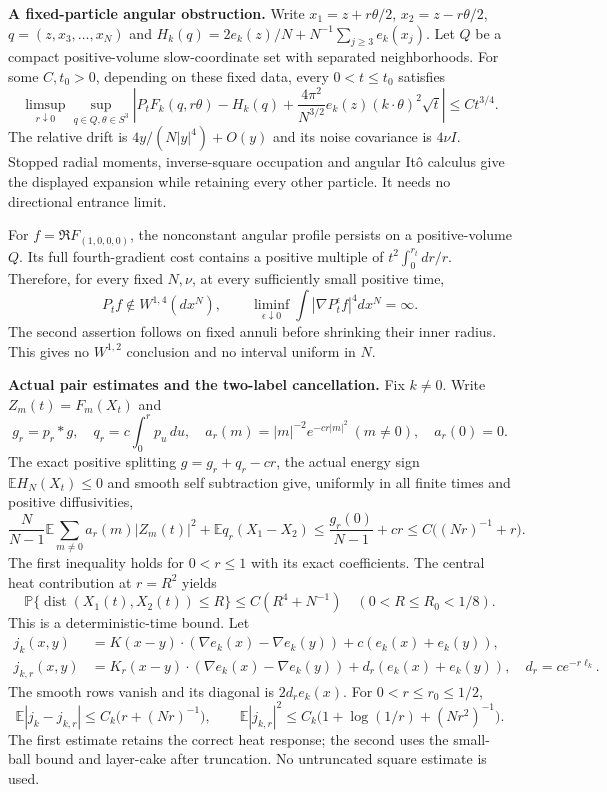 \documentclass[11pt]{article}
\newcommand{\E}{\mathbb E}
\begin{document}
\newpage
\noindent\textbf{A fixed-particle angular obstruction.}
Write $x_1=z+r\theta/2$, $x_2=z-r\theta/2$, $q=(z,x_3,\ldots,x_N)$ and
$H_k(q)=2e_k(z)/N+N^{-1}\sum_{j\ge3}e_k(x_j)$. Let $Q$ be a compact positive-volume slow-coordinate set with separated neighborhoods. For some $C,t_0>0$, depending on these fixed data, every $0<t\le t_0$ satisfies
\[
 \limsup_{r\downarrow0}\sup_{q\in Q,\theta\in S^3}
 \left|P_tF_k(q,r\theta)-H_k(q)
       +\frac{4\pi^2}{N^{3/2}}e_k(z)(k\cdot\theta)^2\sqrt t\right|
 \le Ct^{3/4}.
\]
The relative drift is $4y/(N|y|^4)+O(y)$ and its noise covariance is $4\nu I$. Stopped radial moments, inverse-square occupation and angular It\^o calculus give the displayed expansion while retaining every other particle. It needs no directional entrance limit.

For $f=\Re F_{(1,0,0,0)}$, the nonconstant angular profile persists on a positive-volume $Q$. Its full fourth-gradient cost contains a positive multiple of $t^2\int_0^{r_t}dr/r$. Therefore, for every fixed $N,\nu$, at every sufficiently small positive time,
\[
 P_tf\notin W^{1,4}(dx^N),\qquad
 \liminf_{\epsilon\downarrow0}\int|\nabla P_t^\epsilon f|^4dx^N=\infty.
\]
The second assertion follows on fixed annuli before shrinking their inner radius. This gives no $W^{1,2}$ conclusion and no interval uniform in $N$.

\noindent\textbf{Actual pair estimates and the two-label cancellation.}
Fix $k\ne0$. Write $Z_m(t)=F_m(X_t)$ and
\[
 g_r=p_r*g,\quad q_r=c\int_0^r p_u\,du,\quad
 a_r(m)=|m|^{-2}e^{-cr|m|^2}\ (m\ne0),\quad a_r(0)=0.
\]
The exact positive splitting $g=g_r+q_r-cr$, the actual energy sign $\E H_N(X_t)\le0$ and smooth self subtraction give, uniformly in all finite times and positive diffusivities,
\[
 \frac N{N-1}\E\sum_{m\ne0}a_r(m)|Z_m(t)|^2+\E q_r(X_1-X_2)
 \le\frac{g_r(0)}{N-1}+cr\le C\bigl((Nr)^{-1}+r\bigr).
\]
The first inequality holds for $0<r\le1$ with its exact coefficients. The central heat contribution at $r=R^2$ yields
\[
 \mathbb P\{\operatorname{dist}(X_1(t),X_2(t))\le R\}\le C(R^4+N^{-1})
 \quad(0<R\le R_0<1/8).
\]
This is a deterministic-time bound. Let
\[
 \begin{split}
 j_k(x,y)&=K(x-y)\cdot(\nabla e_k(x)-\nabla e_k(y))+c(e_k(x)+e_k(y)),\\
 j_{k,r}(x,y)&=K_r(x-y)\cdot(\nabla e_k(x)-\nabla e_k(y))
                      +d_r(e_k(x)+e_k(y)),\quad d_r=ce^{-r\ell_k}.
 \end{split}
\]
The smooth rows vanish and its diagonal is $2d_re_k(x)$. For $0<r\le r_0\le1/2$,
\[
 \E|j_k-j_{k,r}|\le C_k\bigl(r+(Nr)^{-1}\bigr),\qquad
 \E|j_{k,r}|^2\le C_k\bigl(1+\log(1/r)+(Nr^2)^{-1}\bigr).
\]
The first estimate retains the correct heat response; the second uses the small-ball bound and layer-cake after truncation. No untruncated square estimate is used.
\end{document}
